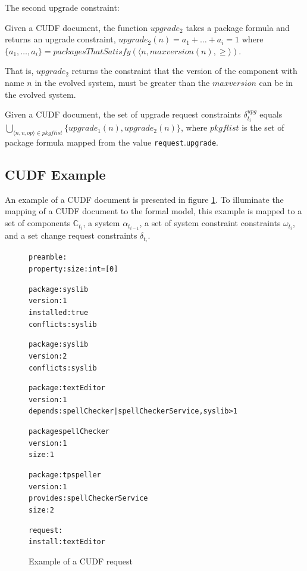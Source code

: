 The second upgrade constraint:
\begin{defs}
Given a CUDF document, the function $upgrade_2$ takes a package formula and returns an upgrade constraint,
$upgrade_2(n) = a_1 + \ldots + a_i = 1$ where $\{a_1,\ldots,a_i\} = packagesThatSatisfy(\langle n,maxversion(n),\geq\rangle)$. 
\end{defs}
That is, $upgrade_2$ returns the constraint that the version of the component with name $n$ in the evolved system, must be greater than the $maxversion$ can be in the evolved system.

\begin{defs}
Given a CUDF document, the set of upgrade request constraints $\delta_{t_i}^{upg}$ equals $\bigcup \limits_{\langle n,v,op \rangle \in pkgflist} \{upgrade_1(n),upgrade_2(n)\}$, 
where $pkgflist$ is the set of package formula mapped from the value \texttt{request}.\texttt{upgrade}.
\end{defs}


\subsection{CUDF Example}
\label{formal.example}
An example of a CUDF document is presented in figure \ref{formal.CUDFEXAMPLE}.
To illuminate the mapping of a CUDF document to the formal model, 
this example is mapped to a set of components $\mathbb{C}_{t_i}$, a system $\alpha_{t_{i-1}}$, 
a set of system constraint constraints $\omega_{t_i}$, 
and a set change request constraints $\delta_{t_i}$.

\begin{figure}[ht] 
\begin{center}
\begin{alltt}
preamble:
property: size: int = [0]

package: syslib
version: 1
installed: true
conflicts: syslib

package: syslib
version: 2
conflicts: syslib

package: textEditor
version: 1
depends: spellChecker | spellCheckerService, syslib > 1

package spellChecker
version: 1
size: 1

package: tpspeller
version: 1
provides: spellCheckerService
size: 2

request:
install:textEditor

\end{alltt}
  \caption[CUDF Example]{Example of a CUDF request}
  \label{formal.CUDFEXAMPLE}
\end{center}
\end{figure} 


